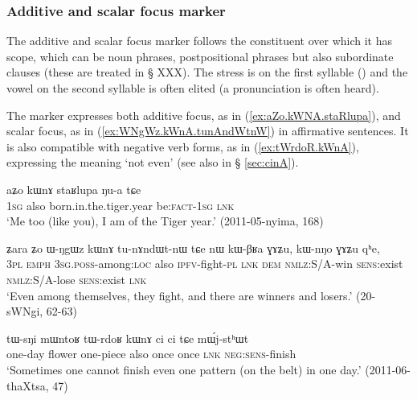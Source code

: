  \subsubsection{Additive and scalar focus marker  } \label{sec:kWnA}
The additive and scalar focus marker  follows the constituent over which it has scope, which can be noun phrases, postpositional phrases but also subordinate clauses (these are treated in § XXX). The stress is on the first syllable () and the vowel on the second syllable is often elited (a pronunciation  is often heard).

The marker  expresses both additive focus, as in (\ref{ex:aZo.kWNA.staRlupa}), and scalar focus, as in (\ref{ex:WNgWz.kWnA.tunAndWtnW}) in affirmative sentences. It is also compatible with negative verb forms, as in (\ref{ex:tWrdoR.kWnA}), expressing the meaning `not even' (see also  in § \ref{sec:cinA}).

\begin{exe}
\ex \label{ex:aZo.kWNA.staRlupa}
\gll aʑo kɯnɤ staʁlupa ŋu-a tɕe \\
\textsc{1sg} also born.in.the.tiger.year be:\textsc{fact}-\textsc{1sg} \textsc{lnk} \\
\glt `Me too (like you), I am of the Tiger year.' (2011-05-nyima, 168)
\end{exe}

\begin{exe}
\ex \label{ex:WNgWz.kWnA.tunAndWtnW}
\gll ʑara ʑo ɯ-ŋgɯz kɯnɤ tu-nɤndɯt-nɯ tɕe nɯ kɯ-βʁa ɣɤʑu, kɯ-nŋo ɣɤʑu qʰe, \\
\textsc{3pl} \textsc{emph} \textsc{3sg}.\textsc{poss}-among:\textsc{loc} also \textsc{ipfv}-fight-\textsc{pl} \textsc{lnk} \textsc{dem} \textsc{nmlz}:S/A-win \textsc{sens}:exist \textsc{nmlz}:S/A-lose  \textsc{sens}:exist \textsc{lnk} \\
\glt `Even among themselves, they fight, and there are winners and losers.' (20-sWNgi, 62-63)
\end{exe}
 
\begin{exe}
\ex \label{ex:tWrdoR.kWnA}
\gll tɯ-sŋi mɯntoʁ tɯ-rdoʁ kɯnɤ ci ci tɕe mɯ́j-stʰɯt \\
one-day flower one-piece also once once \textsc{lnk} \textsc{neg}:\textsc{sens}-finish \\
\glt `Sometimes one cannot finish even one pattern (on the belt) in one day.' (2011-06-thaXtsa, 47)
\end{exe}

